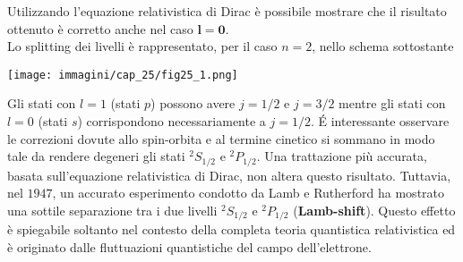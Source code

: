 \documentclass[a4paper,12pt,oneside]{book}
\begin{document}
Utilizzando l'equazione relativistica di Dirac è possibile mostrare che il risultato ottenuto è corretto anche nel caso \textbf{$\boldsymbol{l=0}$}. \\

Lo splitting dei livelli è rappresentato, per il caso $n=2$, nello schema sottostante\\
\begin{center}
\begin{tcolorbox}[width=.9\textwidth ,sharp corners= downhill, colframe=black, colback=white]
\texttt{[image: immagini/cap\_25/fig25\_1.png]}
\end{tcolorbox}
\end{center}

Gli stati con $l=1$ (stati $p$) possono avere $j=1/2$ e $j=3/2$ mentre gli stati con $l=0$ (stati $s$) corrispondono necessariamente a $j=1/2$. \'E interessante osservare le correzioni dovute allo spin-orbita e al termine cinetico si sommano in modo tale da rendere degeneri gli stati $^2S_{1/2}$ e $^2P_{1/2}$.
Una trattazione più accurata, basata sull'equazione relativistica di Dirac, non altera questo risultato. Tuttavia, nel $1947$, un accurato esperimento condotto da Lamb e Rutherford ha mostrato una sottile separazione tra i due livelli $^2S_{1/2}$ e $^2P_{1/2}$ (\textbf{Lamb-shift}). Questo effetto è spiegabile soltanto nel contesto della completa teoria quantistica relativistica ed è originato dalle fluttuazioni quantistiche del campo dell'elettrone.
\end{document}
